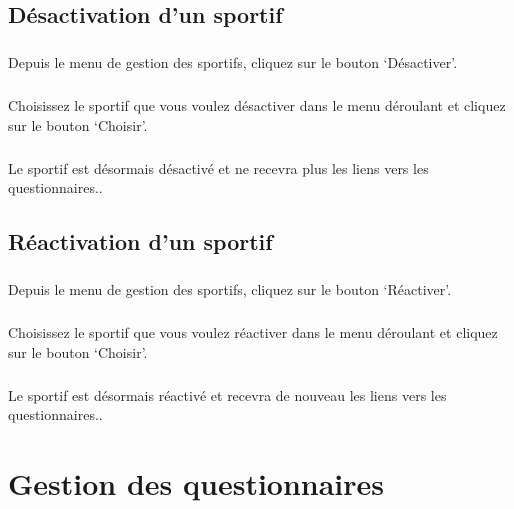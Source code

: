 \documentclass[french,12pt,a4paper,openany]{book}
\begin{document}
\section{Désactivation d'un sportif}
\paragraph{}{Depuis le menu de gestion des sportifs, cliquez sur le bouton `Désactiver'.}
\paragraph{}{Choisissez le sportif que vous voulez désactiver dans le menu déroulant et cliquez sur le bouton `Choisir'.}
\paragraph{}{Le sportif est désormais désactivé et ne recevra plus les liens vers les questionnaires.}.
\section{Réactivation d'un sportif}
\paragraph{}{Depuis le menu de gestion des sportifs, cliquez sur le bouton `Réactiver'.}
\paragraph{}{Choisissez le sportif que vous voulez réactiver dans le menu déroulant et cliquez sur le bouton `Choisir'.}
\paragraph{}{Le sportif est désormais réactivé et recevra de nouveau les liens vers les questionnaires.}.

\chapter{Gestion des questionnaires}
\end{document}
